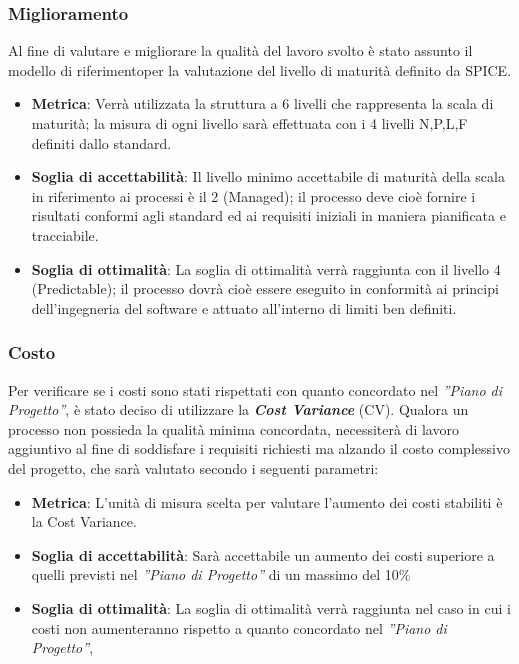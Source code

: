 \subsubsection{Miglioramento}
Al fine di valutare e migliorare la qualità del lavoro svolto è stato assunto il modello di riferimentoper la valutazione del livello di maturità definito da SPICE.
\begin{itemize}
	\item \textbf{Metrica}: Verrà utilizzata la struttura a 6 livelli che rappresenta la scala di maturità; la misura di ogni livello sarà effettuata con i 4 livelli N,P,L,F definiti dallo standard.
	\item \textbf{Soglia di accettabilità}: Il livello minimo accettabile di maturità della scala in riferimento ai processi è il 2 (Managed); il processo deve cioè fornire i risultati conformi agli standard ed ai requisiti iniziali in maniera pianificata e tracciabile.
	\item \textbf{Soglia di ottimalità}: La soglia di ottimalità verrà raggiunta con il livello 4 (Predictable); il processo dovrà cioè essere eseguito in conformità ai principi dell'ingegneria del software e attuato all'interno di limiti ben definiti.
\end{itemize}
\subsubsection{Costo}
Per verificare se i costi sono stati rispettati con quanto concordato nel  \emph{''Piano di Progetto''}, è stato deciso di utilizzare la \emph{\textbf{Cost Variance}} (CV).
Qualora un processo non possieda la qualità minima concordata, necessiterà di lavoro aggiuntivo al fine di soddisfare i requisiti richiesti ma alzando il costo complessivo del progetto, che sarà valutato secondo i seguenti parametri:
\begin{itemize}
	\item \textbf{Metrica}: L'unità di misura scelta per valutare l'aumento dei costi stabiliti è la Cost Variance.
	\item \textbf{Soglia di accettabilità}: Sarà accettabile un aumento dei costi superiore a quelli previsti nel \emph{''Piano di Progetto''} di un massimo del 10\%
	\item \textbf{Soglia di ottimalità}: La soglia di ottimalità verrà raggiunta nel caso in cui i costi non aumenteranno rispetto a quanto concordato nel \emph{''Piano di Progetto''}, 
\end{itemize}

